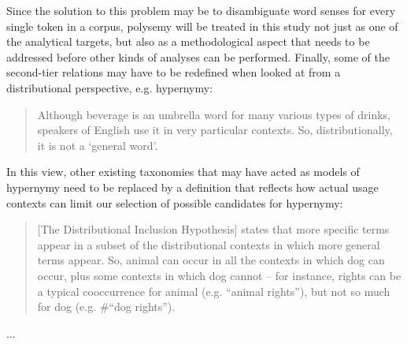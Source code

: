 \documentclass[jou]{apa6} %
\begin{document}
Since the solution to this problem may be to disambiguate word senses for every single token in a corpus, polysemy will be treated in this study not just as one of the analytical targets, but also as a methodological aspect that needs to be addressed before other kinds of analyses can be performed. Finally, some of the second-tier relations may have to be redefined when looked at from a distributional perspective, e.g. hypernymy:
\blockquote[{\cite[p.~443]{herbelotMeasuringSemanticContent2013}}]{Although beverage is an umbrella word for many various types of drinks, speakers of English use it in very particular contexts. So, distributionally, it is not a ‘general word’.}
In this view, other existing taxonomies that may have acted as models of hypernymy need to be replaced by a definition that reflects how actual usage contexts can limit our selection of possible candidates for hypernymy:
\blockquote[{\cite[p.~443]{rollerInclusiveSelectiveSupervised2014}}]{[The Distributional Inclusion Hypothesis] states that more specific terms appear in a subset of the distributional contexts in which more general terms appear. So, animal can occur in all the contexts in which dog can occur, plus some contexts in which dog cannot – for instance, rights can be a typical cooccurrence for animal (e.g. “animal rights”), but not so much for dog (e.g. \#“dog rights”).}
...


\printbibliography
\end{document}
